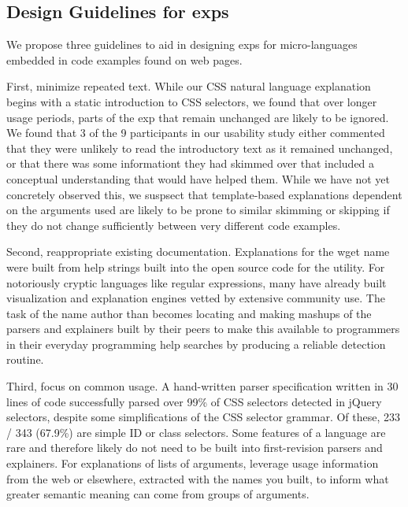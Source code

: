 \begin{changes}
\subsection{Design Guidelines for \Glspl{exp}}
We propose three guidelines to aid in designing \glspl{exp} for micro-languages embedded in code examples found on web pages.

First, minimize repeated text.
While our CSS natural language explanation begins with a static introduction to CSS selectors, we found that over longer usage periods, parts of the \gls{exp} that remain unchanged are likely to be ignored.
We found that 3 of the 9 participants in our usability study either commented that they were unlikely to read the introductory text as it remained unchanged, or that there was some informationt they had skimmed over that included a conceptual understanding that would have helped them.
While we have not yet concretely observed this, we suspsect that template-based explanations dependent on the arguments used are likely to be prone to similar skimming or skipping if they do not change sufficiently between very different code examples.

Second, reappropriate existing documentation.
Explanations for the wget \gls{name} were built from help strings built into the open source code for the utility.
For notoriously cryptic languages like regular expressions, many have already built visualization and explanation engines vetted by extensive community use.
The task of the \gls{name} author than becomes locating and making mashups of the parsers and explainers built by their peers to make this available to programmers in their everyday programming help searches by producing a reliable detection routine.

Third, focus on common usage.
A hand-written parser specification written in 30 lines of code successfully parsed over 99\% of CSS selectors detected in jQuery selectors, despite some simplifications of the CSS selector grammar.
Of these, 233 / 343 (67.9\%) are simple ID or class selectors.
Some features of a language are rare and therefore likely do not need to be built into first-revision parsers and explainers.
For explanations of lists of arguments, leverage usage information from the web or elsewhere, extracted with the \glspl{name} you built, to inform what greater semantic meaning can come from groups of arguments.

\end{changes}
